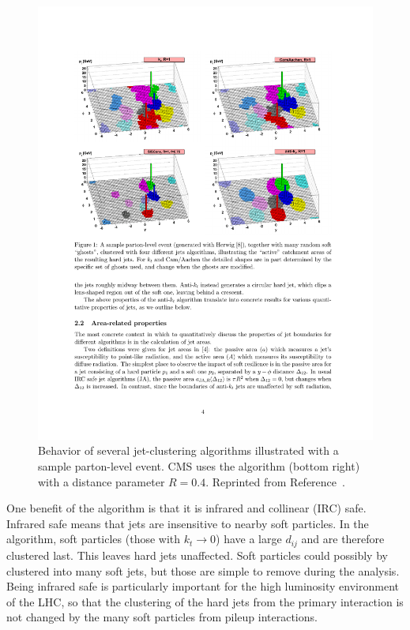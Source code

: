  \begin{figure}[h!]
	\centering
	\includegraphics[width=\linewidth]{Figures/EventReconstruction/jetAlgorithms.pdf}
       \caption{Behavior of several jet-clustering algorithms illustrated with a sample parton-level event. 
       CMS uses the \antikt algorithm (bottom right) with a distance parameter $R = 0.4$.
       Reprinted from Reference~\cite{antikt}.}
       \label{fig:jetAlgorithms}
\end{figure}
 
One benefit of the \antikt algorithm is that it is infrared and collinear (IRC) safe. Infrared safe means that \antikt jets are insensitive to nearby soft particles. In the \antikt algorithm, soft particles (those with $k_t \rightarrow 0$) have a large $d_{ij}$ and are therefore clustered last. This leaves hard jets unaffected. Soft particles could possibly by clustered into many soft jets, but those are simple to remove during the analysis. Being infrared safe is particularly important for the high luminosity environment of the LHC, so that the clustering of the hard jets from the primary interaction is not changed by the many soft particles from pileup interactions.

